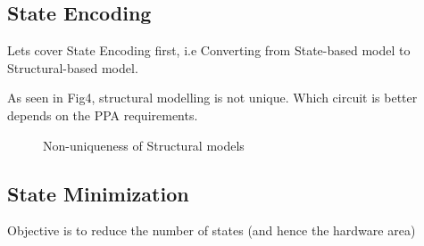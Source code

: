 \documentclass{article}
\begin{document}
\subsection{State Encoding}
Lets cover State Encoding first, i.e Converting from State-based model to Structural-based model.

\vspace{0.5cm}
As seen in Fig4, structural modelling is not unique. Which circuit is better depends on the PPA requirements.
\begin{figure}[htp]%
    \centering
    \qquad
    \caption{Non-uniqueness of Structural models}%
\end{figure}

\newpage
\subsection{State Minimization}
Objective is to reduce the number of states (and hence the hardware area)
\end{document}
